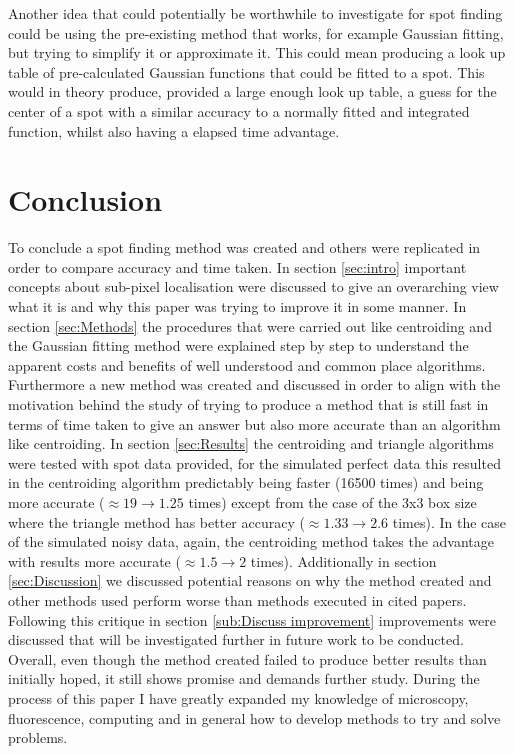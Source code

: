 \documentclass[aps,pra,a4paper,nofootinbib,onecolumn,tightenlines,longbibliography,12pt,amsfonts,amssymb,amsmath,floatfix]{revtex4-2} %
\begin{document}
  Another idea that could potentially be worthwhile to investigate for spot finding could be using the pre-existing 
  method that works, for example Gaussian fitting, but trying to simplify it or approximate it. This could mean 
  producing a look up table of pre-calculated Gaussian functions that could be fitted to a spot. This would in theory 
  produce, provided a large enough look up table, a guess for the center of a spot with a similar accuracy to a 
  normally fitted and integrated function, whilst also having a elapsed time advantage. 



  


\section{Conclusion} %
\label{sec:Conclusion}

  To conclude a spot finding method was created and others were replicated in order to compare 
  accuracy and time taken. In section \ref{sec:intro} important concepts about sub-pixel localisation 
  were discussed to give an overarching view what it is and why this paper was trying to improve it 
  in some manner. In section \ref{sec:Methods} the procedures that were carried out like centroiding 
  and the Gaussian fitting method were explained step by step to understand the apparent costs and benefits 
  of well understood and common place algorithms. Furthermore a new method was created and discussed in order 
  to align with the motivation behind the study of trying to produce a method that is still fast in terms 
  of time taken to give an answer but also more accurate than an algorithm like centroiding. In section \ref{sec:Results}
  the centroiding and triangle algorithms were tested with spot data provided, for the simulated perfect data this resulted 
  in the centroiding algorithm predictably being faster (16500 times) and being more accurate ($\approx 19\rightarrow 1.25$ times) 
  except from the case of the 3x3 box size where the triangle method has better accuracy ($\approx 1.33\rightarrow 2.6$ times).
  In the case of the simulated noisy data, again, the centroiding method takes the advantage with results more 
  accurate ($\approx 1.5\rightarrow 2$ times). Additionally in section \ref{sec:Discussion} we discussed potential 
  reasons on why the method created and other methods used perform worse than methods executed in cited papers. 
  Following this critique in section \ref{sub:Discuss improvement} improvements were discussed that will be investigated 
  further in future work to be conducted. Overall, even though the method created failed to produce better results 
  than initially hoped, it still shows promise and demands further study. During the process of this paper I have 
  greatly expanded my knowledge of microscopy, fluorescence, computing and in general how to develop methods to 
  try and solve problems. 
\end{document}
